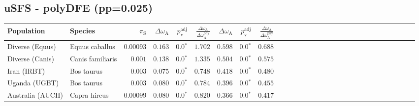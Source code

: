 \subsection{uSFS - polyDFE (pp=0.025)} 
\begin{center}
\begin{adjustbox}{width = 1\textwidth}
\begin{tabular}{|l|l|r|r|r|r|r|r|r|r|r|r|r|r|r|r|r|r|r|r|r|r|r|r|r|r|r|r|r|}
\toprule
                     Population &              Species & $\pi_{\textrm{S}}$ & $\Delta \omega_{\mathrm{A}} $ & $p_{\mathrm{v}}^{\mathrm{adj}}$ & $\frac{\Delta\omega_{\mathrm{A}}}{\Delta\omega_{\mathrm{A}}^{\mathrm{phy}}}$ & $\Delta \omega_{\mathrm{A}} $ & $p_{\mathrm{v}}^{\mathrm{adj}}$ & $\frac{\Delta\omega_{\mathrm{A}}}{\Delta\omega_{\mathrm{A}}^{\mathrm{phy}}}$ \\
\midrule
                Diverse (Equus) &       Equus caballus &          $0.00093$ &                      $ 0.163$ &                  $\bm{0.0{^*}}$ &                                           $ 1.702$ &                      $ 0.598$ &                  $\bm{0.0{^*}}$ &                                           $ 0.688$ \\
                Diverse (Canis) &     Canis familiaris &           $ 0.001$ &                      $ 0.138$ &                  $\bm{0.0{^*}}$ &                                           $ 1.335$ &                      $ 0.504$ &                  $\bm{0.0{^*}}$ &                                           $ 0.575$ \\
                    Iran (IRBT) &           Bos taurus &           $ 0.003$ &                      $ 0.075$ &                  $\bm{0.0{^*}}$ &                                           $ 0.748$ &                      $ 0.418$ &                  $\bm{0.0{^*}}$ &                                           $ 0.480$ \\
                  Uganda (UGBT) &           Bos taurus &           $ 0.003$ &                      $ 0.080$ &                  $\bm{0.0{^*}}$ &                                           $ 0.784$ &                      $ 0.396$ &                  $\bm{0.0{^*}}$ &                                           $ 0.455$ \\
               Australia (AUCH) &         Capra hircus &          $0.00099$ &                      $ 0.080$ &                  $\bm{0.0{^*}}$ &                                           $ 0.820$ &                      $ 0.366$ &                  $\bm{0.0{^*}}$ &                                           $ 0.417$ \\

\end{tabular}
\end{adjustbox}
\end{center}

